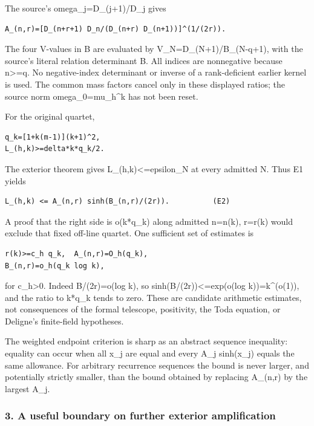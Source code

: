 The source's omega\_j=D\_(j+1)/D\_j gives

\begin{verbatim}
A_(n,r)=[D_(n+r+1) D_n/(D_(n+r) D_(n+1))]^(1/(2r)).
\end{verbatim}

The four V-values in B are evaluated by V\_N=D\_(N+1)/B\_(N-q+1), with the source's literal relation determinant B. All indices are nonnegative because n\textgreater=q. No negative-index determinant or inverse of a rank-deficient earlier kernel is used. The common mass factors cancel only in these displayed ratios; the source norm omega\_0=mu\_h\^{}k has not been reset.

For the original quartet,

\begin{verbatim}
q_k=[1+k(m-1)](k+1)^2,
L_(h,k)>=delta*k*q_k/2.
\end{verbatim}

The exterior theorem gives L\_(h,k)\textless=epsilon\_N at every admitted N. Thus E1 yields

\begin{verbatim}
L_(h,k) <= A_(n,r) sinh(B_(n,r)/(2r)).          (E2)
\end{verbatim}

A proof that the right side is o(k*q\_k) along admitted n=n(k), r=r(k) would exclude that fixed off-line quartet. One sufficient set of estimates is

\begin{verbatim}
r(k)>=c_h q_k,  A_(n,r)=O_h(q_k),
B_(n,r)=o_h(q_k log k),
\end{verbatim}

for c\_h\textgreater0. Indeed B/(2r)=o(log k), so sinh(B/(2r))\textless=exp(o(log k))=k\^{}(o(1)), and the ratio to k*q\_k tends to zero. These are candidate arithmetic estimates, not consequences of the formal telescope, positivity, the Toda equation, or Deligne's finite-field hypotheses.

The weighted endpoint criterion is sharp as an abstract sequence inequality: equality can occur when all x\_j are equal and every A\_j sinh(x\_j) equals the same allowance. For arbitrary recurrence sequences the bound is never larger, and potentially strictly smaller, than the bound obtained by replacing A\_(n,r) by the largest A\_j.

\subsubsection{3. A useful boundary on further exterior amplification}\label{endpoint-pr23_corrected--a-useful-boundary-on-further-exterior-amplification}

